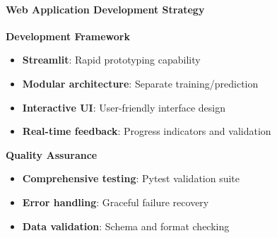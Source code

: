 {
	\framesubtitle{Web Application Development Strategy}
	
	
	\textbf{Development Framework}
	\begin{itemize}
		\item \textbf{Streamlit}: Rapid prototyping capability
		\item \textbf{Modular architecture}: Separate training/prediction
		\item \textbf{Interactive UI}: User-friendly interface design
		\item \textbf{Real-time feedback}: Progress indicators and validation
	\end{itemize}
	
	\textbf{Quality Assurance}
	\begin{itemize}
		\item \textbf{Comprehensive testing}: Pytest validation suite
		\item \textbf{Error handling}: Graceful failure recovery
		\item \textbf{Data validation}: Schema and format checking
	\end{itemize}
		\begin{figure}[H]
		\centering
		
	\end{figure}
}
